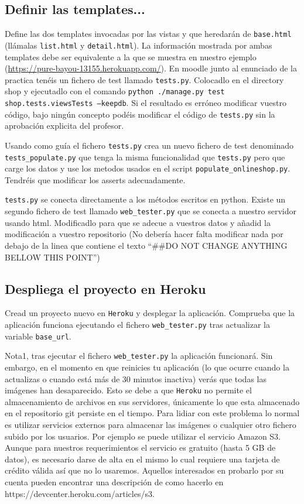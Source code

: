 \documentclass[12pt]{article} %
\newcommand{\herokuurl}[1]{\url{https://pure-bayou-13155.herokuapp.com/#1}}%
\newcommand{\ttt}[1]{\texttt{#1}}%
\newcommand{\proyecto}{\texttt{onlineshop}}%
\newcommand{\heroku}{\texttt{Heroku}}
\newcommand{\populatescript}{\texttt{populate\_\proyecto.py}}
\begin{document}
\subsection{Definir las templates...}
Define las dos templates invocadas por las vistas y que heredarán de \texttt{base.html} (llámalas \texttt{list.html} y \texttt{detail.html}). 
La información mostrada por ambas templates debe ser equivalente a la que se muestra en nuestro ejemplo (\herokuurl{}). En moodle junto al enunciado de la practica tenéis un fichero de test llamado \texttt{tests.py}. Colocadlo en el directory shop y ejecutadlo con el comando \texttt{python ./manage.py test shop.tests.viewsTests --keepdb}. Si el resultado es erróneo modificar vuestro código, bajo ningún concepto podéis modificar el código de \texttt{tests.py} sin la aprobación explicita del profesor.

Usando como guía el fichero \texttt{tests.py} crea un nuevo fichero de test denominado \texttt{tests\_populate.py} que tenga la misma funcionalidad que \texttt{tests.py} pero que
carge los datos y use los metodos usados en el script \populatescript. Tendréis que modificar los asserts adecuadamente. 

\texttt{tests.py} se conecta directamente a los métodos escritos en python. Existe un segundo fichero de test llamado \ttt{web\_tester.py} que se conecta a nuestro servidor usando html. Modificadlo para que se adecue a vuestros datos y añadid la modificación a vuestro repositorio (No debería hacer falta modificar nada por debajo de la linea que contiene el texto ``\#\#DO NOT CHANGE ANYTHING BELLOW THIS POINT'') 

\subsection{Despliega el proyecto en Heroku}
Cread un proyecto nuevo en \heroku{} y desplegar la aplicación. Comprueba que la aplicación funciona ejecutando el fichero \ttt{web\_tester.py} tras actualizar la variable \ttt{base\_url}. 

Nota1, tras ejecutar el fichero \ttt{web\_tester.py} la aplicación funcionará. Sin embargo, en el momento en que reinicies tu aplicación (lo que ocurre cuando la actualizas o cuando está más de 30 minutos inactiva) verás que todas las imágenes han desaparecido. Esto se debe a que \heroku{} no permite el almacenamiento de archivos en sus servidores, únicamente lo que esta almacenado en el repositorio git persiste en el tiempo. Para lidiar con este problema lo normal es utilizar servicios externos para almacenar las imágenes o cualquier otro fichero subido por los usuarios. Por ejemplo se puede utilizar el servicio Amazon S3. Aunque para nuestros requerimientos el servicio es gratuito (hasta 5 GB de datos), es necesario darse de alta en el mismo lo cual requiere una tarjeta de crédito válida así que no lo usaremos. Aquellos interesados en probarlo por su cuenta pueden encontrar una descripción de como hacerlo en {https://devcenter.heroku.com/articles/s3}.
\end{document}
